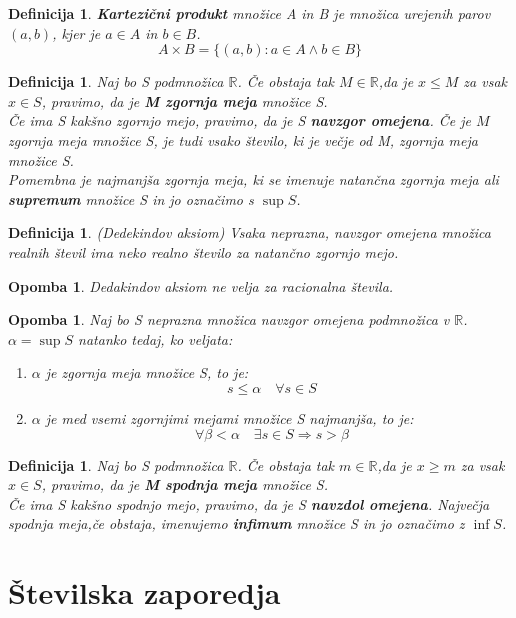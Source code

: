 \documentclass[11pt]{article}
\newtheorem{Definicija}[Izrek]{{\sc Definicija}}
\newtheorem{Opomba}[Izrek]{{\sc Opomba}}
\begin{document}
\begin{Definicija}
	\textbf{Kartezični produkt} množice A in B je množica urejenih parov $(a,b)$, kjer je $a\in A$ in $b\in B$.
	$$A \times B = \{(a,b): a\in A \land b\in B \}$$
\end{Definicija}
\begin{Definicija}
	Naj bo S podmnožica $\mathbb{R}$. Če obstaja tak $M\in\mathbb{R}$,da je $x\le M$ za vsak $x\in S$, pravimo, da je \textbf{M zgornja meja} množice S.
	\\
	Če ima S kakšno zgornjo mejo, pravimo, da je S \textbf{navzgor omejena}. Če je $M$ zgornja meja množice S, je tudi vsako število, ki je večje od M, zgornja meja množice S.
	\\
	Pomembna je najmanjša zgornja meja, ki se imenuje natančna zgornja meja ali \textbf{supremum} množice S in jo označimo s $\sup S$.
\end{Definicija}
\begin{Definicija}
	(Dedekindov aksiom) Vsaka neprazna, navzgor omejena množica realnih števil ima neko realno število za natančno zgornjo mejo.
\end{Definicija}
\begin{Opomba}
	Dedakindov aksiom ne velja za racionalna števila.
\end{Opomba}
\begin{Opomba}
	Naj bo S neprazna množica navzgor omejena podmnožica v $\mathbb{R}$. $\alpha = \sup S$ natanko tedaj, ko veljata:
	\begin{enumerate}
		\item
		$\alpha$ je zgornja meja množice S, to je:
		$$ s\le \alpha \quad \forall s\in S$$
		\item
		$\alpha$ je med vsemi zgornjimi mejami množice S najmanjša, to je:
		$$\forall \beta < \alpha \quad \exists s\in S \Rightarrow s >\beta$$
	\end{enumerate}
\end{Opomba}
\begin{Definicija}
	Naj bo S podmnožica $\mathbb{R}$. Če obstaja tak $m\in\mathbb{R}$,da je $x\ge m$ za vsak $x\in S$, pravimo, da je \textbf{M spodnja meja} množice S.
	\\
	Če ima S kakšno spodnjo mejo, pravimo, da je S \textbf{navzdol omejena}. Največja spodnja meja,če obstaja, imenujemo \textbf{infimum} množice S in jo označimo z $\inf S$.
\end{Definicija}
\section{Številska zaporedja}
\end{document}
